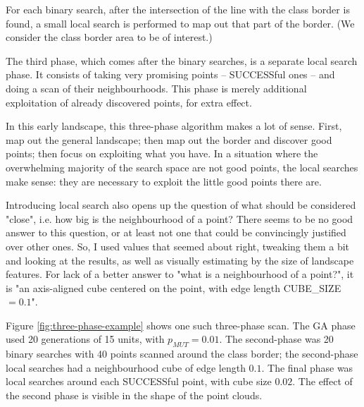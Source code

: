 \documentclass[times, utf8, diplomski]{fer}
\begin{document}
For each binary search, after the intersection of the line with the class border
is found, a small local search is performed to map out that part of the border.
(We consider the class border area to be of interest.)

The third phase, which comes after the binary searches, is a separate local
search phase. It consists of taking very promising points -- SUCCESSful ones --
and doing a scan of their neighbourhoods. This phase is merely additional
exploitation of already discovered points, for extra effect.


In this early landscape, this three-phase algorithm makes a lot of sense.
First, map out the general landscape; then map out the border and discover
good points; then focus on exploiting what you have. In a situation where
the overwhelming majority of the search space are not good points, the
local searches make sense: they are necessary to exploit the little good
points there are.

Introducing local search also opens up the question of what should be considered
"close", i.e. how big is the neighbourhood of a point? There seems to be no good
answer to this question, or at least not one that could be convincingly justified
over other ones. So, I used values that seemed about right, tweaking them a bit
and looking at the results, as well as visually estimating by the size of
landscape features. For lack of a better answer to "what is a neighbourhood of
a point?", it is "an axis-aligned cube centered on the point, with edge length
CUBE\_SIZE $=0.1$".

Figure \ref{fig:three-phase-example} shows one such three-phase scan. The GA
phase used 20 generations of 15 units, with $p_{MUT}=0.01$. The second-phase
was 20 binary searches with 40 points scanned around the class border; the
second-phase local searches had a neighbourhood cube of edge length $0.1$.
The final phase was local searches around each SUCCESSful point, with cube
size $0.02$. The effect of the second phase is visible in the shape of the
point clouds.
\end{document}
